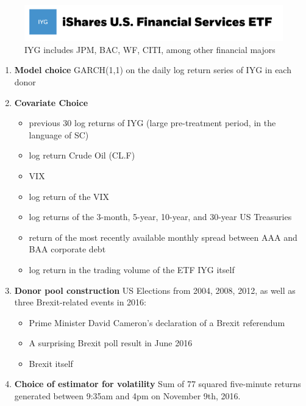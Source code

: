 \documentclass[9pt]{beamer}
\theoremstyle{definition}
\begin{document}
    \begin{frame}
        \begin{figure}[H]
            \begin{center}
              \includegraphics[scale=.2]{iyg.png}
              \caption{IYG includes JPM, BAC, WF, CITI, among other financial majors}
              \end{center}
            \end{figure}
    \begin{enumerate}
        \item \textbf{Model choice} GARCH(1,1) on the daily log return series of IYG in each donor
    
        \item \textbf{Covariate Choice} 
        \begin{itemize}
            \item previous 30 log returns of IYG (large pre-treatment period, in the language of SC)
            \item log return Crude Oil (CL.F)
            \item VIX
            \item log return of the VIX
            \item log returns of the 3-month, 5-year, 10-year, and 30-year US Treasuries
            \item return of the most recently available monthly spread between AAA and BAA corporate debt
            \item log return in the trading volume of the ETF IYG itself
        \end{itemize}
    
        \item \textbf{Donor pool construction} US Elections from 2004, 2008, 2012, as well as three Brexit-related events in 2016: 
        \begin{itemize}
        \item Prime Minister David Cameron's declaration of a Brexit referendum
        \item A surprising Brexit poll result in June 2016
        \item Brexit itself
        \end{itemize}
    
        \item \textbf{Choice of estimator for volatility} Sum of 77 squared five-minute returns generated between 9:35am and 4pm on November 9th, 2016.
    \end{enumerate} 
    
    \end{frame}
    
\end{document}
